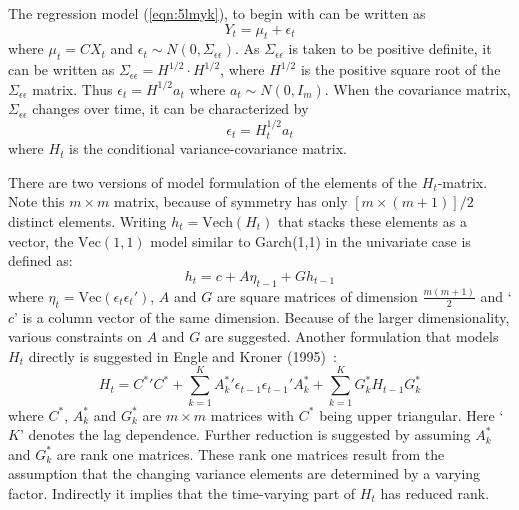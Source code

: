 The regression model (\ref{eqn:5lmyk}), to begin with can be written as
	\begin{equation}\label{eqn:3relabel}
	Y_t= \mu_t+\epsilon_t
	\end{equation}
where $\mu_t=CX_t$ and $\epsilon_t \sim N(0,\Sigma_{\epsilon\epsilon})$. As $\Sigma_{\epsilon\epsilon}$ is taken to be positive definite, it can be written as $\Sigma_{\epsilon\epsilon}=H^{1/2} \cdot H^{1/2}$, where $H^{1/2}$ is the positive square root of the $\Sigma_{\epsilon\epsilon}$ matrix. Thus $\epsilon_t=H^{1/2}a_t$ where $a_t \sim N(0,I_m)$. When the covariance matrix, $\Sigma_{\epsilon\epsilon}$ changes over time, it can be characterized by
	\begin{equation}
	\epsilon_t=H^{1/2}_t a_t
	\end{equation}
where $H_t$ is the conditional variance-covariance matrix.


There are two versions of model formulation of the elements of the $H_t$-matrix. Note this $m \times m$ matrix, because of symmetry has only $[m \times (m+1)]/2$ distinct elements. Writing $h_t=\text{Vech}(H_t)$ that stacks these elements as a vector, the $\text{Vec}(1,1)$ model similar to Garch(1,1) in the univariate case is defined as:
	\begin{equation}\label{eqn:vecmodel}
	h_t= c + A \eta_{t-1} + G h_{t-1}
	\end{equation}
where $\eta_t=\text{Vec}(\epsilon_t \epsilon_t')$, $A$ and $G$ are square matrices of dimension $\frac{m(m+1)}{2}$ and `$c$' is a column vector of the same dimension. Because of the larger dimensionality, various constraints on $A$ and $G$ are suggested. Another formulation that models $H_t$ directly is suggested in Engle and Kroner (1995)~\cite{kroner}:
	\begin{equation}\label{eqn:kroner}
	H_t=C^*\prime C^* + \sum_{k=1}^K A_k^*\prime \epsilon_{t-1} \epsilon_{t-1}' A_k^* + \sum_{k=1}^K G_k^* H_{t-1}G_k^*
	\end{equation}
where $C^*$, $A_k^*$ and $G_k^*$ are $m \times m$ matrices with $C^*$ being upper triangular. Here `$K$' denotes the lag dependence. Further reduction is suggested by assuming $A_k^*$ and $G_k^*$ are rank one matrices. These rank one matrices result from the assumption that the changing variance elements are determined by a varying factor. Indirectly it implies that the time-varying part of $H_t$ has reduced rank. 


